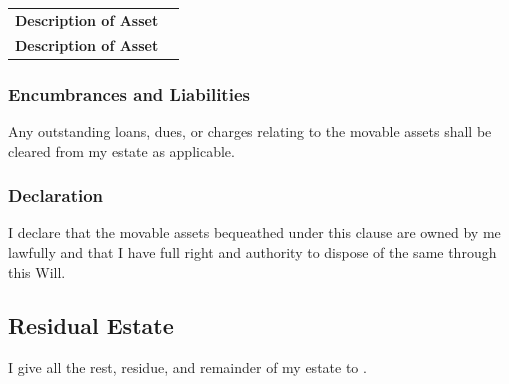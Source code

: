 \noindent
\begin{tabular}{p{8cm} p{8cm}}
\textbf{Description of Asset} & \FirstBeneficiaryName{} \\ 
\textbf{Description of Asset} & \SecondBeneficiaryName{} \\ 
\end{tabular}

\subsubsection*{Encumbrances and Liabilities}
Any outstanding loans, dues, or charges relating to the movable assets shall be cleared from my estate as applicable. 

\subsubsection*{Declaration}
I declare that the movable assets bequeathed under this clause are owned by me lawfully and that I have full right and authority to dispose of the same through this Will.

\subsection{Residual Estate}
I give all the rest, residue, and remainder of my estate to \FirstBeneficiaryName{}.

